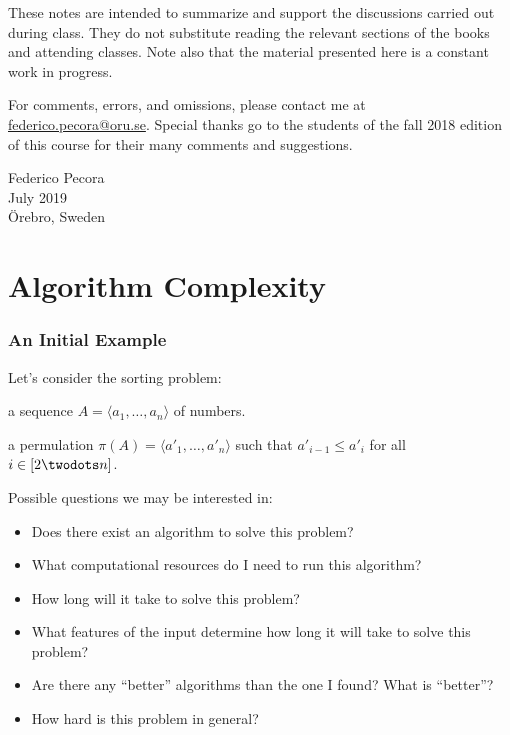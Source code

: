 \documentclass[a4paper]{report}
\theoremstyle{definition}
\begin{document}
These notes are intended to summarize and support the discussions carried out during class. They do not substitute reading the relevant sections of the books and attending classes. Note also that the material presented here is a constant work in progress.

For comments, errors, and omissions, please contact me at \url{federico.pecora@oru.se}. Special thanks go to the students of the fall 2018 edition of this course for their many comments and suggestions.

\vspace{0.3cm}
\begin{flushright}
  Federico Pecora\\
  July 2019\\
  \"Orebro, Sweden
\end{flushright}

\tableofcontents
\newpage


\part{Algorithm Complexity}

\section{An Initial Example}
Let's consider the sorting problem:

 a sequence $A = \langle a_1, \dots{}, a_n \rangle$ of numbers.

 a permulation $\pi(A) = \langle a'_1, \dots{}, a'_n\rangle$ such that $a'_{i-1} \leq a'_{i}$ for all $i \in [2 \twodots n]$.

Possible questions we may be interested in:
\begin{itemize}
\item Does there exist an algorithm to solve this problem?
\item What computational resources do I need to run this algorithm?
\item How long will it take to solve this problem?
\item What features of the input determine how long it will take to solve this problem?
\item Are there any ``better'' algorithms than the one I found? What is ``better''?
\item How hard is this problem in general?
\end{itemize}
\end{document}
